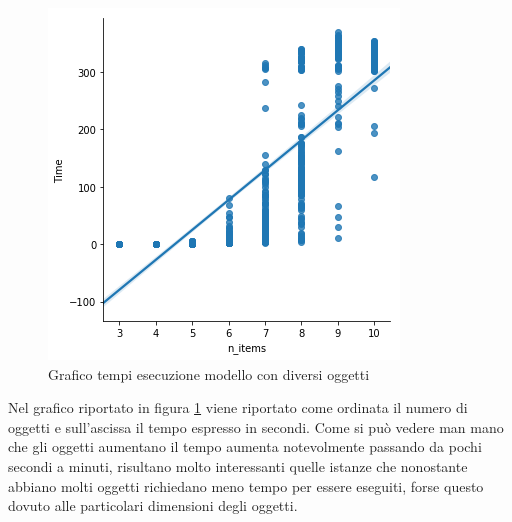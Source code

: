 \begin{figure}[!ht]
	\begin{center} \includegraphics[scale=0.8]{figures/time_nitems}
		\caption[Grafico tempi esecuzione]{Grafico tempi esecuzione modello con diversi oggetti}  
		\label{fig:times}
	\end{center}
\end{figure}

Nel grafico riportato in figura \ref{fig:times} viene riportato come ordinata il numero di oggetti e sull'ascissa il tempo espresso in secondi. 
Come si può vedere man mano che gli oggetti aumentano il tempo aumenta notevolmente passando da pochi secondi a minuti, risultano molto interessanti quelle istanze che nonostante abbiano molti oggetti richiedano meno tempo per essere eseguiti, forse questo dovuto alle particolari dimensioni degli oggetti.

